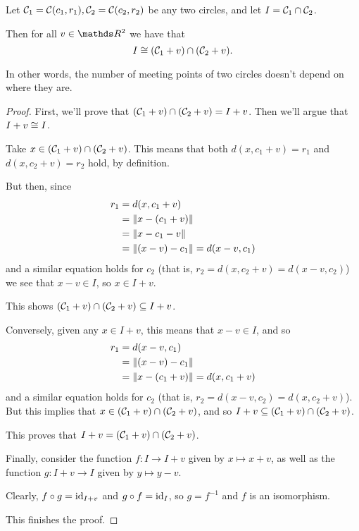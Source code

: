 \begin{lemma}
	Let $\mathcal C_1=\mathcal C(c_1,r_1),\mathcal C_2=\mathcal C(c_2,r_2)$ be any two circles, and let $I=\mathcal C_1\cap \mathcal C_2$.
	
	Then for all $v\in \R^2$ we have that 
	\[I\cong (\mathcal C_1+v)\cap (\mathcal C_2+v).\]
	
	In other words, the number of meeting points of two circles doesn't depend on where they are.
\end{lemma}
\begin{proof}
	First, we'll prove that $(\mathcal C_1+v)\cap (\mathcal C_2+v)=I+v$. Then we'll argue that $I+v\cong I$.
	
	Take $x\in (\mathcal C_1+v)\cap (\mathcal C_2+v)$. This means that both $d(x,c_1+v)=r_1$ and $d(x,c_2+v)=r_2$ hold, by definition.
	
	But then, since
	\begin{align*}
		r_1&=d(x,c_1+v)\\
		&=\lVert x-(c_1+v)\rVert\\
		&=\lVert x-c_1-v\rVert\\
		&=\lVert(x-v)-c_1\rVert=d(x-v,c_1)
	\end{align*} and a similar equation holds for $c_2$ (that is, $r_2=d(x,c_2+v)=d(x-v,c_2)$) we see that $x-v\in I$, so $x\in I+v$.
	
	This shows $(\mathcal C_1+v)\cap (\mathcal C_2+v)\subseteq I+v$.
	
	\bigskip
	Conversely, given any $x\in I+v$, this means that $x-v\in I$, and so 
	\begin{align*}
		r_1&=d(x-v,c_1)\\
		&=\lVert(x-v)-c_1\rVert\\
		&=\lVert x-(c_1+v)\rVert=d(x,c_1+v)
	\end{align*}
	and a similar equation holds for $c_2$ (that is, $r_2=d(x-v,c_2)=d(x,c_2+v)$). But this implies that $x\in (\mathcal C_1+v)\cap (\mathcal C_2+v)$, and so $I+v\subseteq (\mathcal C_1+v)\cap (\mathcal C_2+v)$.
	
	This proves that $I+v=(\mathcal C_1+v)\cap (\mathcal C_2+v)$.
	
	\bigskip
	Finally, consider the function $f:I\to I+v$ given by $x\mapsto x+v$, as well as the function $g:I+v\to I$ given by $y\mapsto y-v$.
	
	Clearly, $f\circ g={\rm id}_{I+v}$ and $g\circ f={\rm id}_I$, so $g=f^{-1}$ and $f$ is an isomorphism.
	
	This finishes the proof.
\end{proof}

